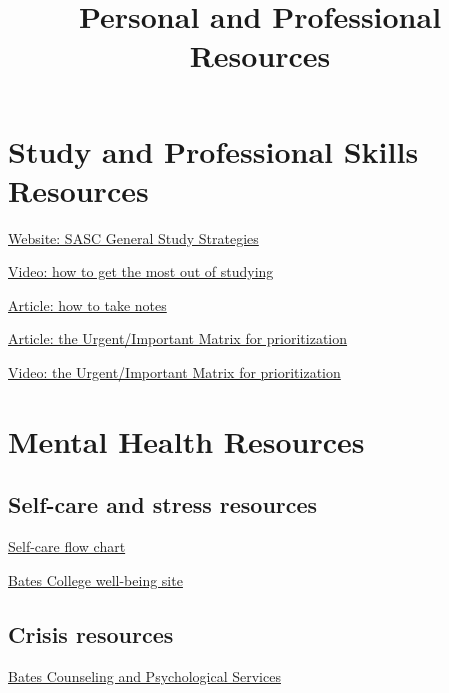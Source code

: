 \documentclass[
  letterpaper,
  DIV=11,
  numbers=noendperiod]{scrartcl}
\title{Personal and Professional Resources}
\author{}
\date{}
\renewcommand*\contentsname{Table of contents}
\newcommand\contentsname{Table of contents}
\begin{document}
\maketitle

\renewcommand*\contentsname{Table of contents}
{
\setcounter{tocdepth}{3}
\tableofcontents
}

\section{Study and Professional Skills
Resources}\label{profdevresources}

\href{https://www.bates.edu/student-academic-support-center/general-study-resources-and-strategies/}{Website:
SASC General Study Strategies}

\href{https://www.samford.edu/departments/academic-success-center/how-to-study}{Video:
how to get the most out of studying}

\href{pdfs/HowToTakeNotes.pdf}{Article: how to take notes}

\href{https://www.mindtools.com/al1e0k5/eisenhowers-urgentimportant-principle}{Article:
the Urgent/Important Matrix for prioritization}

\href{https://www.youtube.com/watch?v=jxiCV0vwVT8}{Video: the
Urgent/Important Matrix for prioritization}

\section{Mental Health Resources}\label{mentalhealthresources}

\subsection{Self-care and stress
resources}\label{self-care-and-stress-resources}

\href{https://philome.la/jace_harr/you-feel-like-shit-an-interactive-self-care-guide/play/index.html}{Self-care
flow chart}

\href{https://www.bates.edu/well-being/}{Bates College well-being site}

\subsection{Crisis resources}\label{crisis-resources}

\href{https://www.bates.edu/counseling-psychological-services/\#scheduling}{Bates
Counseling and Psychological Services}
\end{document}
